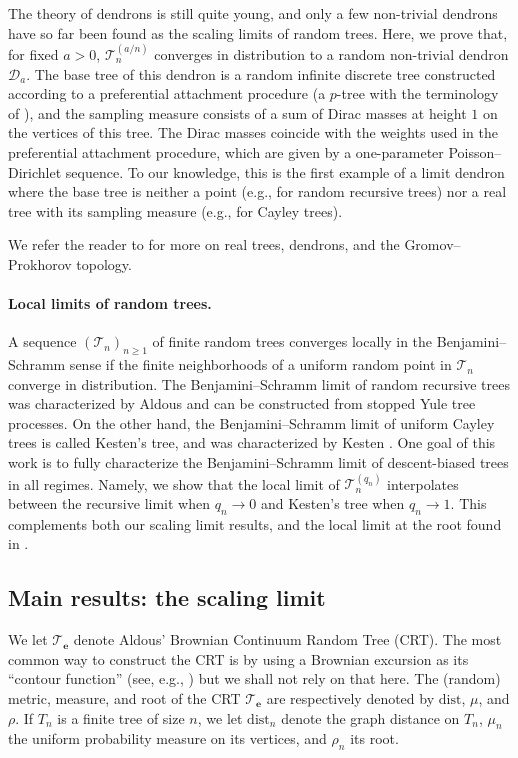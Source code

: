 \documentclass{article}
\theoremstyle{remark}
\newcommand{\dist}{\mathrm{dist}}
\newcommand{\cT}{\mathcal{T}}
\newcommand{\cD}{\mathcal{D}}
\newcommand{\be}{\mathbf{e}}
\begin{document}
The theory of dendrons is still quite young, and only a few non-trivial dendrons have so far been found as the scaling limits of random trees.
Here, we prove that, for fixed $a>0$, $\cT_n^{(a/n)}$ converges in distribution to a random non-trivial dendron $\cD_a$.
The base tree of this dendron is a random infinite discrete tree constructed according to a preferential attachment procedure (a $p$-tree with the terminology of \cite{Camarri_Pitman_2000,Blanc-Renaudie_2025}), and the sampling measure consists of a sum of Dirac masses at height $1$ on the vertices of this tree.
The Dirac masses coincide with the weights used in the preferential attachment procedure, which are given by a one-parameter Poisson--Dirichlet sequence.
To our knowledge, this is the first example of a limit dendron where the base tree is neither a point (e.g., for random recursive trees) nor a real tree with its sampling measure (e.g., for Cayley trees).

We refer the reader to  for more on real trees, dendrons, and the Gromov--Prokhorov topology.

\paragraph{Local limits of random trees.}
A sequence $(\cT_n)_{n \geq 1}$ of finite random trees converges locally in the Benjamini--Schramm sense if the finite neighborhoods of a uniform random point in $\cT_n$ converge in distribution. 
The Benjamini--Schramm limit of random recursive trees was characterized by Aldous \cite{Aldous_1991} and can be constructed from stopped Yule tree processes. 
On the other hand, the Benjamini--Schramm limit of uniform Cayley trees is called Kesten's tree, and was characterized by Kesten \cite{Kesten_1986}. 
One goal of this work is to fully characterize the Benjamini--Schramm limit of descent-biased trees in all regimes.
Namely, we show that the local limit of $\cT_n^{(q_n)}$ interpolates between the recursive limit when $q_n \to 0$ and Kesten's tree when $q_n \to 1$.
This complements both our scaling limit results, and the local limit at the root found in \cite{Thevenin_Wagner_2023}.


\subsection{Main results: the scaling limit}

We let $\cT_\be$ denote Aldous' Brownian Continuum Random Tree (CRT).
The most common way to construct the CRT is by using a Brownian excursion as its \enquote{contour function} 
(see, e.g., \cite{Aldous_1993})
but we shall not rely on that here.
The (random) metric, measure, and root of the CRT $\cT_\be$ are respectively denoted by $\dist$, $\mu$, and $\rho$.
If $T_n$ is a finite tree of size $n$, we let $\dist_n$ denote the graph distance on $T_n$, $\mu_n$ the uniform probability measure on its vertices, and $\rho_n$ its root.
\end{document}
